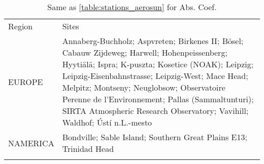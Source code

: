 \begin{table}
 \scriptsize
 \begin{tabularx}{\textwidth}{lX}
  \tophline
  Region   & Sites                                                                                                                                                                                                                                                                                                                                                                            \\
  \middlehline
  EUROPE   & Annaberg-Buchholz; Aspvreten; Birkenes II; Bösel; Cabauw Zijdeweg; Harwell; Hohenpeissenberg; Hyytiälä; Ispra; K-puszta; Kosetice (NOAK); Leipzig; Leipzig-Eisenbahnstrasse; Leipzig-West; Mace Head; Melpitz; Montseny; Neuglobsow; Observatoire Perenne de l'Environnement; Pallas (Sammaltunturi); SIRTA Atmospheric Research Observatory; Vavihill; Waldhof; Ústí n.L.-mesto \\
  NAMERICA & Bondville; Sable Island; Southern Great Plains E13; Trinidad Head                                                                                                                                                                                                                                                                                                                \\
  \bottomhline
 \end{tabularx}
 \caption{Same as \ref{table:stations_aerosun} for Abs. Coef.}
 \label{table:stations_abs}
\end{table}
